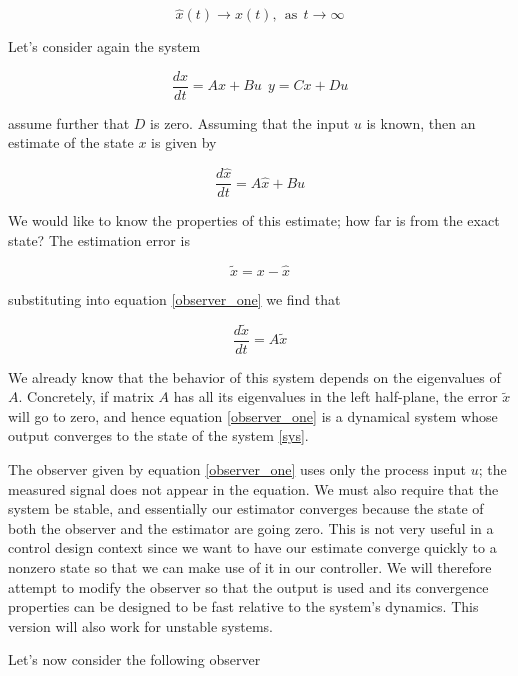 \begin{equation}
\hat{x}(t) \rightarrow x(t), ~~ \text{as} ~~ t \rightarrow \infty  
\end{equation}

Let's consider again the system

\begin{equation}
\frac{dx}{dt} = Ax + Bu ~~ y = Cx + Du
\label{sys}
\end{equation}

assume further that $D$ is zero. Assuming that the input $u$ is known, then an estimate of the state $x$ is given by

\begin{equation}
\frac{d\hat{x}}{dt} = A\hat{x} + Bu
\label{observer_one} 
\end{equation}  

We would like to know the properties of this estimate; how far is from the exact state? The estimation error is \cite{Astrom} 

\begin{equation}
\tilde{x} = x - \hat{x} 
\end{equation} 

substituting into equation \ref{observer_one} we find that


\begin{equation}
\frac{d\tilde{x}}{dt} = A\tilde{x}  
\end{equation}  

We already know that the behavior of this system depends on the eigenvalues of $A$. Concretely, if matrix $A$ has all its eigenvalues in the left half-plane, the error $\tilde{x}$ will go to zero,
and hence equation \ref{observer_one} is a dynamical system whose output converges to the state
of the system \ref{sys}.


The observer given by equation \ref{observer_one} uses only the process input $u$; the measured
signal does not appear in the equation. We must also require that the system be stable,
and essentially our estimator converges because the state of both the observer and
the estimator are going zero. This is not very useful in a control design context since
we want to have our estimate converge quickly to a nonzero state so that we can
make use of it in our controller. We will therefore attempt to modify the observer
so that the output is used and its convergence properties can be designed to be fast
relative to the system’s dynamics. This version will also work for unstable systems.

Let's now consider the following observer

